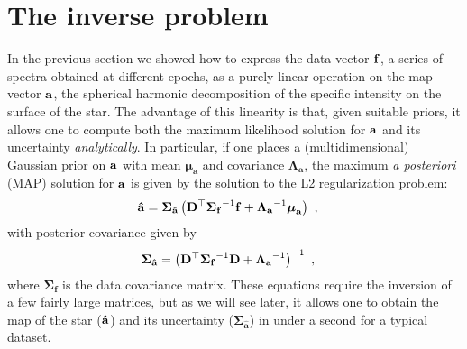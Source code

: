 \documentclass[modern]{aastex631}
\begin{document}
\section{The inverse problem}
\label{sec:inverse}
%
In the previous section we showed how to express the data vector ${\mathbf{f}}$, a series of spectra obtained at different epochs, as a purely linear operation on the map vector ${\mathbf{a}}$, the spherical harmonic decomposition of the specific intensity on the surface of the star. 
The advantage of this linearity is that, given suitable priors, it allows one to compute both the maximum likelihood solution for ${\mathbf{a}}$ and its uncertainty \emph{analytically}. 
In particular, if one places a (multidimensional) Gaussian prior on ${\mathbf{a}}$ with mean $\boldsymbol{\mu}_\mathbf{a}$ and covariance $\boldsymbol{\Lambda}_\mathbf{a}$, the maximum \emph{a posteriori} (MAP)
solution for ${\mathbf{a}}$ is given by the solution to the L2 regularization problem:
%
\begin{align}
    \label{eq:inverse:ahat}
    {\ensuremath{\mathbf{\hat{a}}}} & =
    \boldsymbol{\Sigma}_\mathbf{\hat{a}}
    \left(
    {\mathbf{D}}^\top
    {\boldsymbol{\Sigma}_\mathbf{f}}^{-1}
    {\mathbf{f}}
    +
    {\boldsymbol{\Lambda}_{{\mathbf{a}}}}^{-1} \boldsymbol{\mu}_\mathbf{a}
    \right)
    \hskip 0.33em,
\end{align}
%
with posterior covariance given by
%
\begin{align}
    \label{eq:inverse:acov}
    \boldsymbol{\Sigma}_\mathbf{\hat{a}} & =
    \left(
    {\mathbf{D}}^\top
    {\boldsymbol{\Sigma}_\mathbf{f}}^{-1}
    {\mathbf{D}}
    +
    {\boldsymbol{\Lambda}_{{\mathbf{a}}}}^{-1}
    \right)^{-1}
    \hskip 0.33em,
\end{align}
%
where $\boldsymbol{\Sigma}_\mathbf{f}$ is the data covariance matrix. 
These equations require the inversion of a few fairly large matrices, but as we will see later, it allows one to obtain the map of the star (${\mathbf{\hat{a}}}$) and its uncertainty ($\boldsymbol{\Sigma}_{\mathbf{\hat{a}}}$) in under a second for a typical dataset.
\end{document}
